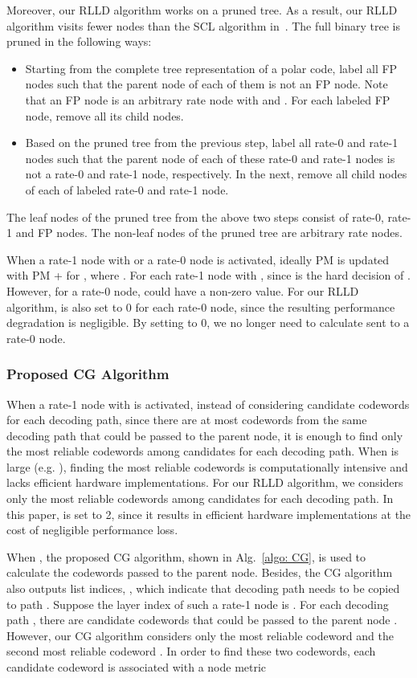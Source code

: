 \documentclass[journal]{IEEEtran}
\begin{document}
Moreover, our RLLD algorithm works on a pruned tree. As a result, our RLLD algorithm visits fewer nodes than the SCL algorithm in~\cite{ido_it, tree_list_dec}. The full binary tree is pruned in the following ways:
\begin{itemize}
\item Starting from the complete tree representation of a polar code, label all FP nodes such that the parent node of each of them is not an FP node. Note that an FP node  is an arbitrary rate node with  and . For each labeled FP node, remove all its child nodes.
\item Based on the pruned tree from the previous step, label all rate-0 and rate-1 nodes such that the parent node of each of these rate-0 and rate-1 nodes is not a rate-0 and rate-1 node, respectively. In the next, remove all child nodes of each of labeled rate-0 and rate-1 node.
\end{itemize}
The leaf nodes of the pruned tree from the above two steps consist of rate-0, rate-1 and FP nodes. The non-leaf nodes of the pruned tree are arbitrary rate nodes.

When a rate-1 node with  or a rate-0 node is activated, ideally PM is updated with PM +  for , where . For each rate-1 node with ,  since  is the hard decision of . However, for a rate-0 node,  could have a non-zero value. For our RLLD algorithm,  is also set to 0 for each rate-0 node, since the resulting performance degradation is negligible. By setting  to 0, we no longer need to calculate  sent to a rate-0 node.

\subsubsection{Proposed CG Algorithm}

When a rate-1 node with  is activated, instead of considering  candidate codewords for each decoding path, since there are at most  codewords from the same decoding path that could be passed to the parent node, it is enough to find only the  most reliable codewords among  candidates for each decoding path. When  is large (e.g. ), finding the  most reliable codewords is computationally intensive and lacks efficient hardware implementations. For our RLLD algorithm, we considers only the  most reliable codewords among  candidates for each decoding path. In this paper,  is set to 2, since it results in efficient hardware implementations at the cost of negligible performance loss.

When , the proposed CG algorithm, shown in Alg.~\ref{algo: CG}, is used to calculate the codewords passed to the parent node. Besides, the CG algorithm also outputs  list indices, , which indicate that decoding path  needs to be copied to path . Suppose the layer index of such a rate-1 node  is . For each decoding path , there are  candidate codewords that could be passed to the parent node . However, our CG algorithm considers only the most reliable codeword  and the second most reliable codeword . In order to find these two codewords, each candidate codeword  is associated with a node metric
\end{document}

